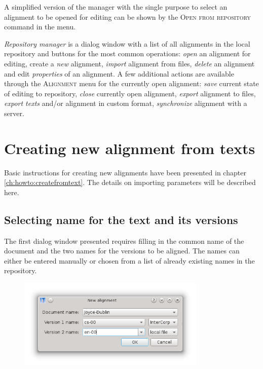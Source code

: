 \documentclass[a4paper,10pt,oneside]{book}
\newcommand{\menu}[1]{\textsc{#1}}
\begin{document}
A simplified version of the manager with the single purpose to select an alignment to be opened for editing can be shown by the \menu{Open from repository} command in the menu.

\emph{Repository manager} is a dialog window with a list of all alignments in the local repository and buttons for the most common operations: \emph{open} an alignment for editing, create a \emph{new} alignment, \emph{import} alignment from files, \emph{delete} an alignment and edit \emph{properties} of an alignment. A few additional actions are available through the \menu{Alignment} menu for the currently open alignment: \emph{save} current state of editing to repository, \emph{close} currently open alignment, \emph{export} alignment to files, \emph{export texts} and/or alignment in custom format, \emph{synchronize} alignment with a server.

\section{Creating new alignment from texts}\label{ch:detail:managing_local:new}

Basic instructions for creating new alignments have been presented in chapter \ref{ch:howto:createfromtext}. The details on importing parameters will be described here.

\subsection{Selecting name for the text and its versions}\label{ch:detail:managing_local:new:names}

The first dialog window presented requires filling in the common name of the document and the two names for the versions to be aligned. The names can either be entered manually or chosen from a list of already existing names in the repository.

\begin{figure}[htb]
 \includegraphics[width=0.8\textwidth]{screenshots/new_alignment.png}
\end{figure}
\end{document}
